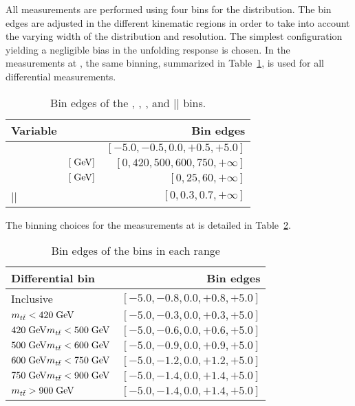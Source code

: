 All measurements are performed using four bins for the \dy{}
distribution.
The bin edges are adjusted in the different kinematic regions in order
to take into account the varying width of the distribution and \dy{}
resolution. The simplest configuration yielding a negligible bias in
the unfolding response is chosen. In the measurements at \seventev{},
the same \dy{} binning, summarized in Table~\ref{tab:unf:binning7tev},
is used for all differential measurements. 
\begin{table}[htbp]
  \begin{center}
    \begin{tabular}{l l r}
      \toprule
      Variable & & Bin edges \\
      \midrule
      \dy{}         &            & $[-5.0, -0.5, 0.0, +0.5, +5.0]$ \\
      \mtt{}        & $[\; \mathrm{GeV}{}]$ & $[0, 420, 500, 600, 750,
      +\infty{}]$ \\
      \pttt{}       & $[\; \mathrm{GeV}{}]$ & $[0, 25, 60, +\infty{}]$ \\
      |\ytt{}|     &            & $[0, 0.3, 0.7, +\infty{}]$ \\
      \bottomrule
     \end{tabular}
   \end{center}
  \caption{Bin edges of the \dy{}, \mtt{}, \pttt{}, and |\ytt{}|
  bins.}
  \label{tab:unf:binning7tev}
\end{table}
The binning choices for the measurements at \eighttev{} is detailed in
Table~\ref{tab:unf:binning8tev}.
\begin{table}[htbp]
  \begin{center}
    \begin{tabular}{l r}
      \toprule
      Differential bin & Bin edges \\
      \midrule
      Inclusive & $[-5.0, -0.8, 0.0, +0.8, +5.0]$ \\
      \midrule
      $m_{t\bar{t}}{}<420\; \mathrm{GeV}{}$ & $[-5.0, -0.3, 0.0, +0.3, +5.0]$ \\
      $420\; \mathrm{GeV}{}m_{t\bar{t}}{}<500\; \mathrm{GeV}{}$ & $[-5.0, -0.6, 0.0, +0.6, +5.0]$ \\
      $500\; \mathrm{GeV}{}m_{t\bar{t}}{}<600\; \mathrm{GeV}{}$ & $[-5.0, -0.9, 0.0, +0.9, +5.0]$ \\
      $600\; \mathrm{GeV}{}m_{t\bar{t}}{}<750\; \mathrm{GeV}{}$ & $[-5.0, -1.2, 0.0, +1.2, +5.0]$ \\
      $750\; \mathrm{GeV}{}m_{t\bar{t}}{}<900\; \mathrm{GeV}{}$ & $[-5.0, -1.4, 0.0, +1.4, +5.0]$ \\
      $m_{t\bar{t}}{}>900\; \mathrm{GeV}{}$ & $[-5.0, -1.4, 0.0, +1.4, +5.0]$ \\
      \bottomrule
     \end{tabular}
   \end{center}
  \caption{Bin edges of the \dy{} bins in each \mtt{} range}
  \label{tab:unf:binning8tev}
\end{table}

